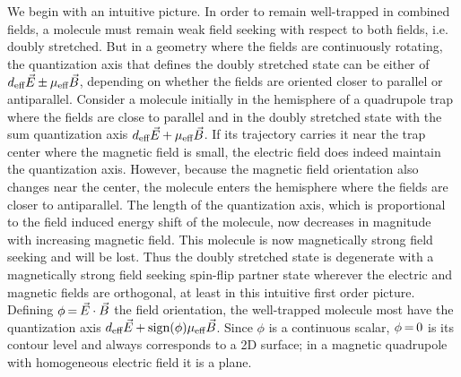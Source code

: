 \documentclass[%
 reprint,
 amsmath,amssymb,
 aps,
prl,
]{revtex4-1}
\newcommand{\s}{{\nobreak\hspace{.2em}}}
\begin{document}
We begin with an intuitive picture.
In order to remain well-trapped in combined fields, a molecule must remain weak field seeking with respect to both fields, i.e. doubly stretched.
But in a geometry where the fields are continuously rotating, the quantization axis that defines the doubly stretched state can be either of $d_\text{eff}\vec{E} \s {\pm}\s  \mu_\text{eff}\vec{B}$, depending on whether the fields are oriented closer to parallel or antiparallel.
Consider a molecule initially in the hemisphere of a quadrupole trap where the fields are close to parallel and in the doubly stretched state with the sum quantization axis $d_\text{eff}\vec{E} \s {+}\s  \mu_\text{eff}\vec{B}$.
If its trajectory carries it near the trap center where the magnetic field is small, the electric field does indeed maintain the quantization axis.
However, because the magnetic field orientation also changes near the center, the molecule enters the hemisphere where the fields are closer to antiparallel.
The length of the quantization axis, which is proportional to the field induced energy shift of the molecule, now decreases in magnitude with increasing magnetic field.
This molecule is now magnetically strong field seeking and will be lost.
Thus the doubly stretched state is degenerate with a magnetically strong field seeking spin-flip partner state wherever the electric and magnetic fields are orthogonal, at least in this intuitive first order picture.
Defining $\phi\s {=}\s\vec{E}\cdot\vec{B}$ the field orientation, the well-trapped molecule most have the quantization axis $d_\text{eff}\vec{E}\s {+}\s\text{sign}(\phi)\mu_\text{eff}\vec{B}$.
Since $\phi$ is a continuous scalar, $\phi\s{=}\s 0$ is its contour level and always corresponds to a 2D surface; in a magnetic quadrupole with homogeneous electric field it is a plane.
\end{document}
